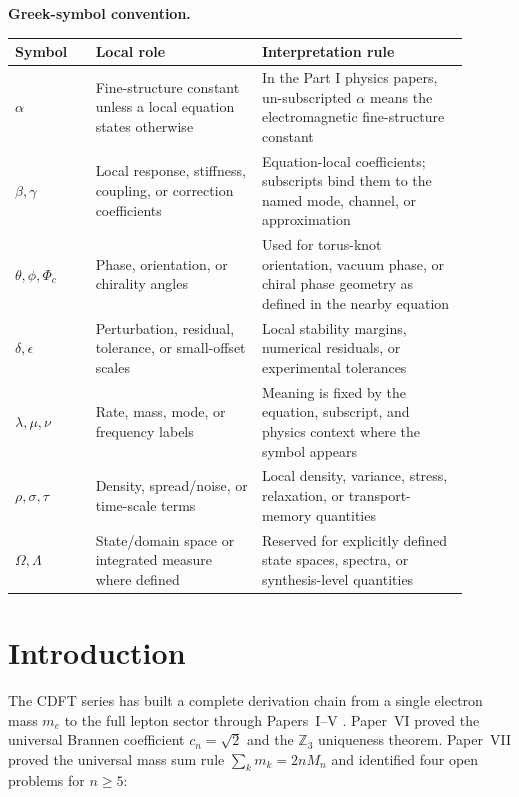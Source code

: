 \documentclass[11pt]{article}
\begin{document}
\noindent\textbf{Greek-symbol convention.}
\begin{center}
{\small
\begin{tabular}{p{0.16\linewidth}p{0.33\linewidth}p{0.41\linewidth}}
\hline
Symbol & Local role & Interpretation rule \\
\hline
$\alpha$ & Fine-structure constant unless a local equation states otherwise & In the Part I physics papers, un-subscripted $\alpha$ means the electromagnetic fine-structure constant \\
$\beta,\gamma$ & Local response, stiffness, coupling, or correction coefficients & Equation-local coefficients; subscripts bind them to the named mode, channel, or approximation \\
$\theta,\phi,\Phi_c$ & Phase, orientation, or chirality angles & Used for torus-knot orientation, vacuum phase, or chiral phase geometry as defined in the nearby equation \\
$\delta,\epsilon$ & Perturbation, residual, tolerance, or small-offset scales & Local stability margins, numerical residuals, or experimental tolerances \\
$\lambda,\mu,\nu$ & Rate, mass, mode, or frequency labels & Meaning is fixed by the equation, subscript, and physics context where the symbol appears \\
$\rho,\sigma,\tau$ & Density, spread/noise, or time-scale terms & Local density, variance, stress, relaxation, or transport-memory quantities \\
$\Omega,\Lambda$ & State/domain space or integrated measure where defined & Reserved for explicitly defined state spaces, spectra, or synthesis-level quantities \\
\hline
\end{tabular}
}
\end{center}


\section{Introduction}

The CDFT series has built a complete derivation chain from a single
electron mass $m_e$ to the full lepton sector through Papers~I--V
\cite{MujjabiI2026,MujjabiII2026,MujjabiIII2026,MujjabiIV2026,MujjabiV2026}.
Paper~VI \cite{MujjabiVI2026} proved the universal Brannen coefficient
$c_n = \sqrt{2}$ and the $\mathbb{Z}_3$ uniqueness theorem.
Paper~VII \cite{MujjabiVII2026} proved the universal mass sum rule
$\sum_k m_k = 2nM_n$ and identified four open problems for $n \geq 5$:
\end{document}
